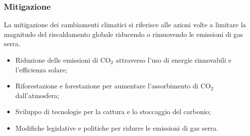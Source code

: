 \documentclass{article}
\begin{document}
\subsubsection{Mitigazione}
La mitigazione dei cambiamenti climatici si riferisce alle azioni volte a limitare la magnitudo
del riscaldamento globale riducendo o rimuovendo le emissioni di gas serra.
\begin{itemize}
    \item Riduzione delle emissioni di CO$_2$ attraverso l'uso di energie rinnovabili e
        l'efficienza solare;
    \item Riforestazione e forestazione per aumentare l'assorbimento di CO$_2$ dall'atmosfera;
    \item Sviluppo di tecnologie per la cattura e lo stoccaggio del carbonio;
    \item Modifiche legislative e politiche per ridurre le emissioni di gas serra.
\end{itemize}
\end{document}

